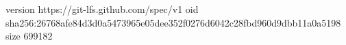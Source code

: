 version https://git-lfs.github.com/spec/v1
oid sha256:26768afe84d3d0a5473965e05dee352f0276d6042c28fbd960d9dbb11a0a5198
size 699182
